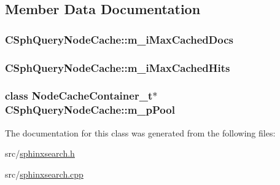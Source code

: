 \subsection{Member Data Documentation}
\hypertarget{classCSphQueryNodeCache_a14cf24fd5d3b6171033d44337cecc365}{
\subsubsection[{m\-\_\-i\-Max\-Cached\-Docs}]{ C\-Sph\-Query\-Node\-Cache\-::m\-\_\-i\-Max\-Cached\-Docs\hspace{0.3cm}{\ttfamily [protected]}}}\label{classCSphQueryNodeCache_a14cf24fd5d3b6171033d44337cecc365}
\hypertarget{classCSphQueryNodeCache_aed09ffd75262e5a617fb5fbac132869f}{
\subsubsection[{m\-\_\-i\-Max\-Cached\-Hits}]{ C\-Sph\-Query\-Node\-Cache\-::m\-\_\-i\-Max\-Cached\-Hits\hspace{0.3cm}{\ttfamily [protected]}}}\label{classCSphQueryNodeCache_aed09ffd75262e5a617fb5fbac132869f}
\hypertarget{classCSphQueryNodeCache_aec59621ee1b07bb83caea0a2b24dd0ca}{
\subsubsection[{m\-\_\-p\-Pool}]{\setlength{\rightskip}{0pt plus 5cm}class {\bf Node\-Cache\-Container\-\_\-t}$\ast$ C\-Sph\-Query\-Node\-Cache\-::m\-\_\-p\-Pool\hspace{0.3cm}{\ttfamily [protected]}}}\label{classCSphQueryNodeCache_aec59621ee1b07bb83caea0a2b24dd0ca}


The documentation for this class was generated from the following files\-:\begin{DoxyCompactItemize}
\item 
src/\hyperlink{sphinxsearch_8h}{sphinxsearch.\-h}\item 
src/\hyperlink{sphinxsearch_8cpp}{sphinxsearch.\-cpp}\end{DoxyCompactItemize}
